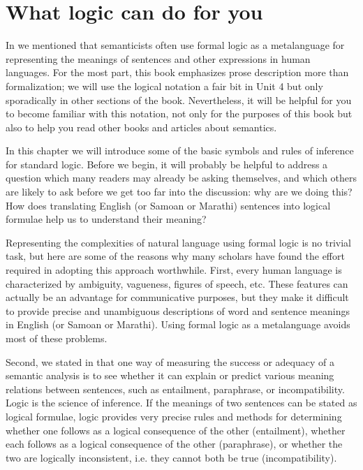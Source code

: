 \section{What logic can do for you}\label{sec:} %

In  we mentioned that semanticists often use formal logic as a metalanguage for representing the meanings of sentences and other expressions in human languages. For the most part, this book emphasizes prose description more than formalization; we will use the logical notation a fair bit in Unit 4 but only sporadically in other sections of the book. Nevertheless, it will be helpful for you to become familiar with this notation, not only for the purposes of this book but also to help you read other books and articles about semantics.



In this chapter we will introduce some of the basic symbols and rules of inference for standard logic. Before we begin, it will probably be helpful to address a question which many readers may already be asking themselves, and which others are likely to ask before we get too far into the discussion: why are we doing this? How does translating English (or Samoan or Marathi) sentences into logical formulae help us to understand their meaning?



Representing the complexities of natural language using formal logic is no trivial task, but here are some of the reasons why many scholars have found the effort required in adopting this approach worthwhile. First, every human language is characterized by ambiguity, vagueness, figures of speech, etc. These features can actually be an advantage for communicative purposes, but they make it difficult to provide precise and unambiguous descriptions of word and sentence meanings in English (or Samoan or Marathi). Using formal logic as a metalanguage avoids most of these problems.



Second, we stated in  that one way of measuring the success or adequacy of a semantic analysis is to see whether it can explain or predict various meaning relations between sentences, such as entailment, paraphrase, or incompatibility. Logic is the science of inference. If the meanings of two sentences can be stated as logical formulae, logic provides very precise rules and methods for determining whether one follows as a logical consequence of the other (entailment), whether each follows as a logical consequence of the other (paraphrase), or whether the two are logically inconsistent, i.e. they cannot both be true (incompatibility).




